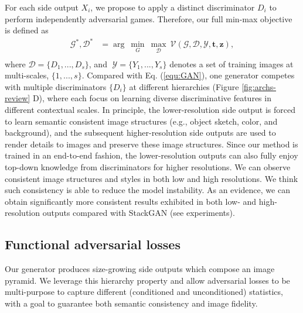 \documentclass[10pt,twocolumn,letterpaper]{article}
\begin{document}
For each side output $X_i$, we propose to apply a distinct discriminator $D_i$ to perform independently adversarial games. Therefore, our full min-max objective is defined as 
\begin{equation}
\label{equ:optim}
\begin{split}
  \mathcal{G}^*, \mathcal{D}^*&  =  \arg~\underset{G}{\min}\ \underset{\mathcal{D}}{\max}~ \mathcal{V}(\mathcal{G},\mathcal{D}, \mathcal{Y}, \bm t, \bm z), \\
\end{split}
\end{equation}
where $\mathcal{D}  =  \{D_1, ..., D_s\} $, and $\; \mathcal{Y} = \{Y_1, ..., Y_s\}$ denotes a set of training images at multi-scales, $\{1,...,s\}$.
Compared with Eq. (\ref{equ:GAN}), one generator competes with multiple discriminators  $\{D_i\}$ at different hierarchies (Figure \ref{fig:archs-review} D), where each focus on learning diverse discriminative features in different contextual scales.
In principle, the lower-resolution side output is forced to learn semantic consistent image structures (e.g., object sketch, color, and background), and the subsequent higher-resolution side outputs are used to render details to images and preserve these image structures. Since our method is trained in an end-to-end fashion, the lower-resolution outputs can also fully enjoy top-down knowledge from discriminators for higher resolutions. We can observe consistent image structures and styles in both low and high resolutions.
We think such consistency is able to reduce the model instability.
As an evidence, we can obtain significantly more consistent results exhibited in both low- and high-resolution outputs compared with StackGAN (see experiments). 

\subsection{Functional adversarial losses}
Our generator produces size-growing side outputs which compose an image pyramid. 
We leverage this hierarchy property and allow adversarial losses to be multi-purpose to capture different (conditioned and unconditioned) statistics, with a goal to guarantee both semantic consistency and image fidelity. 
\end{document}
